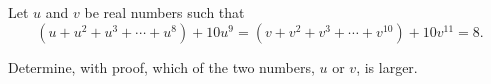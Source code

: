 Let $u$ and $v$ be real numbers such that\[ (u + u^2 + u^3 + \cdots + u^8) + 10u^9 = (v + v^2 + v^3 + \cdots + v^{10}) + 10v^{11} = 8.  \]

Determine, with proof, which of the two numbers, $u$ or $v$,  is larger.